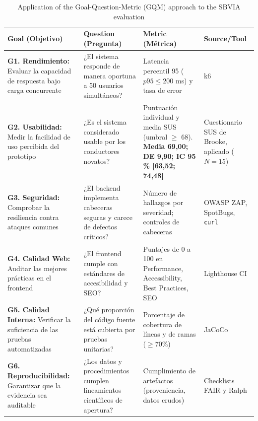 \documentclass[11pt,a4paper]{report}
\begin{document}
\begin{table}[htbp]
\centering
\caption{Application of the Goal-Question-Metric (GQM) approach to the SBVIA evaluation}
\label{tab:gqm}
\footnotesize
\begin{tabularx}{\textwidth}{p{3.5cm}Xp{2.5cm}p{2.5cm}}
\toprule
\textbf{Goal (Objetivo)} & \textbf{Question (Pregunta)} & \textbf{Metric (Métrica)} & \textbf{Source/Tool} \\
\midrule
\textbf{G1. Rendimiento:} Evaluar la capacidad de respuesta bajo carga concurrente & ¿El sistema responde de manera oportuna a 50 usuarios simultáneos? & Latencia percentil 95 ($p95 \le 200$ ms) y tasa de error & k6 \\
\midrule
\textbf{G2. Usabilidad:} Medir la facilidad de uso percibida del prototipo & ¿Es el sistema considerado usable por los conductores novatos? & Puntuación individual y media SUS (umbral $\geq$ 68). \textbf{Media 69,00; DE 9,90; IC 95\,\% [63,52; 74,48]} & Cuestionario SUS de Brooke, aplicado ($N = 15$) \\
\midrule
\textbf{G3. Seguridad:} Comprobar la resiliencia contra ataques comunes & ¿El backend implementa cabeceras seguras y carece de defectos críticos? & Número de hallazgos por severidad; controles de cabeceras & OWASP ZAP, SpotBugs, \texttt{curl} \\
\midrule
\textbf{G4. Calidad Web:} Auditar las mejores prácticas en el frontend & ¿El frontend cumple con estándares de accesibilidad y SEO? & Puntajes de 0 a 100 en Performance, Accessibility, Best Practices, SEO & Lighthouse CI \\
\midrule
\textbf{G5. Calidad Interna:} Verificar la suficiencia de las pruebas automatizadas & ¿Qué proporción del código fuente está cubierta por pruebas unitarias? & Porcentaje de cobertura de líneas y de ramas ($\ge 70\%$) & JaCoCo \\
\midrule
\textbf{G6. Reproducibilidad:} Garantizar que la evidencia sea auditable & ¿Los datos y procedimientos cumplen lineamientos científicos de apertura? & Cumplimiento de artefactos (proveniencia, datos crudos) & Checklists FAIR y Ralph \\
\bottomrule
\end{tabularx}
\end{table}
\end{document}
